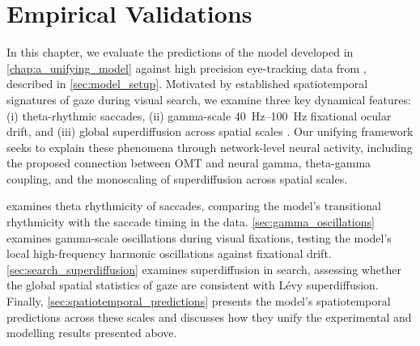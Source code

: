 \chapter{Empirical Validations}\label{chap:empirical_validations}
In this chapter, we evaluate the predictions of the model developed in \cref{chap:a_unifying_model} against high precision eye-tracking data from \textcite{naher_primate_saccades}, described in \cref{sec:model_setup}. Motivated by established spatiotemporal signatures of gaze during visual search, we examine three key dynamical features: (i) theta-rhythmic saccades, (ii) gamma-scale \qtyrange{40}{100}{\hertz} fixational ocular drift, and (iii) global superdiffusion across spatial scales \cite{mahanama_eye_2022, martinez-conde_role_2004}. Our unifying framework seeks to explain these phenomena through network-level neural activity, including the proposed connection between OMT and neural gamma, theta-gamma coupling, and the monoscaling of superdiffusion across spatial scales.

 examines theta rhythmicity of saccades, comparing the model's transitional rhythmicity with the saccade timing in the data. \cref{sec:gamma_oscillations} examines gamma-scale oscillations during visual fixations, testing the model's local high-frequency harmonic oscillations against fixational drift. \cref{sec:search_superdiffusion} examines superdiffusion in search, assessing whether the global spatial statistics of gaze are consistent with Lévy superdiffusion. Finally, \cref{sec:spatiotemporal_predictions} presents the model's spatiotemporal predictions across these scales and discusses how they unify the experimental and modelling results presented above.










